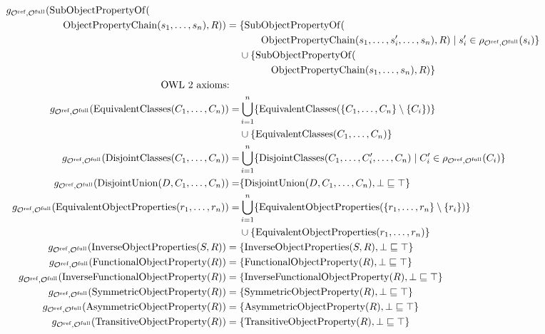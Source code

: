 \begin{definition}
\begin{widepage}
\begin{align*}
      g_{\Omcref,\Omcfull}(\op{SubObjectPropertyOf}( \qquad \qquad \qquad \qquad \quad & \\ \op{ObjectPropertyChain}(s_1, \dots, s_n), R)) ={} & \{\op{SubObjectPropertyOf}( \\& \qquad \op{ObjectPropertyChain}(s_1, \dots, s_i', \dots, s_n), R) \mid s_i' \in \rho_{\Omcref,\Omcfull} (s_i)\} \\& \cup \{\op{SubObjectPropertyOf}( \\& \quad \qquad \op{ObjectPropertyChain}(s_1, \dots, s_n), R)\} \\
      \text{OWL 2 axioms:} \quad & \\
      g_{\Omcref,\Omcfull}(\op{EquivalentClasses}(C_1, \dots, C_n)) = & \bigcup_{i=1}^n \{ \op{EquivalentClasses}(\{C_1, \dots, C_n\} \setminus \{C_i\}) \} \\& \cup \{ \op{EquivalentClasses}(C_1, \dots, C_n) \} \\
      g_{\Omcref,\Omcfull}(\op{DisjointClasses}(C_1, \dots, C_n)) = & \bigcup_{i=1}^n \{ \op{DisjointClasses}(C_1, \dots, C_i', \dots, C_n) \mid C_i' \in \rho_{\Omcref,\Omcfull}(C_i) \} \\
      g_{\Omcref,\Omcfull}(\op{DisjointUnion}(D, C_1, \dots, C_n)) = & \{ \op{DisjointUnion}(D, C_1, \dots, C_n), \bot \sqsubseteq \top \} \\
      g_{\Omcref,\Omcfull}(\op{EquivalentObjectProperties}(r_1, \dots, r_n)) = & \bigcup_{i=1}^n \{ \op{EquivalentObjectProperties}(\{r_1, \dots, r_n\} \setminus \{r_i\}) \} \\& \cup \{ \op{EquivalentObjectProperties}(r_1, \dots, r_n) \} \\
      g_{\Omcref,\Omcfull}(\op{InverseObjectProperties}(S, R)) ={} & \{ \op{InverseObjectProperties}(S, R), \bot \sqsubseteq \top \} \\
      g_{\Omcref,\Omcfull}(\op{FunctionalObjectProperty}(R)) ={} & \{ \op{FunctionalObjectProperty}(R), \bot \sqsubseteq \top \} \\
      g_{\Omcref,\Omcfull}(\op{InverseFunctionalObjectProperty}(R)) ={} & \{ \op{InverseFunctionalObjectProperty}(R), \bot \sqsubseteq \top \} \\
      g_{\Omcref,\Omcfull}(\op{SymmetricObjectProperty}(R)) ={} & \{ \op{SymmetricObjectProperty}(R), \bot \sqsubseteq \top \} \\
      g_{\Omcref,\Omcfull}(\op{AsymmetricObjectProperty}(R)) ={} & \{ \op{AsymmetricObjectProperty}(R), \bot \sqsubseteq \top \} \\
      g_{\Omcref,\Omcfull}(\op{TransitiveObjectProperty}(R)) ={} & \{ \op{TransitiveObjectProperty}(R), \bot \sqsubseteq \top \} \\

\end{align*}
\end{widepage}
\end{definition}
